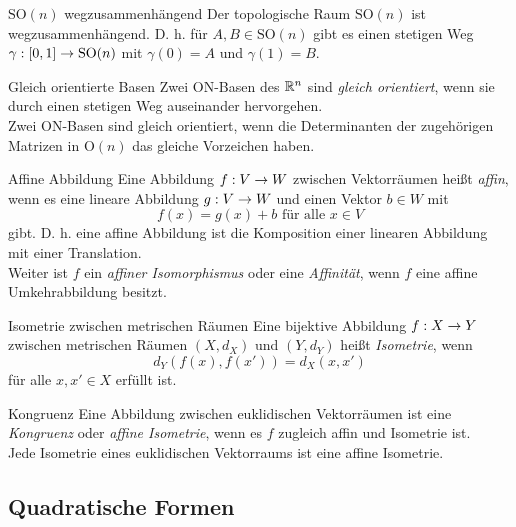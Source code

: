 \documentclass[main.tex]{subfiles}
\begin{document}
\begin{karte}{\( \mathrm{SO}(n) \) wegzusammenhängend}
    Der topologische Raum \( \mathrm{SO}(n) \) ist 
    wegzusammenhängend. D. h. für \( A,B\in \mathrm{SO}(n) \) 
    gibt es einen stetigen Weg \( \gamma : [0,1] \rightarrow \mathrm{SO}(n) \)
    mit \( \gamma(0) = A \) und \( \gamma(1) = B \).
\end{karte}

\begin{karte}{Gleich orientierte Basen}
    Zwei ON-Basen des \(\mathbb{R}^n\) sind \textit{gleich orientiert}, 
    wenn sie durch einen stetigen Weg auseinander hervorgehen.\\
    Zwei ON-Basen sind gleich orientiert, wenn die 
    Determinanten der zugehörigen Matrizen in \( \mathrm{O}(n) \) 
    das gleiche Vorzeichen haben.
\end{karte}

\begin{karte}{Affine Abbildung}
    Eine Abbildung \( f : V \rightarrow W \) zwischen Vektorräumen 
    heißt \textit{affin}, wenn es eine lineare Abbildung 
    \( g : V \rightarrow W \) und einen Vektor \( b \in W \) mit 
    \[ f(x) = g(x) + b \text{ für alle }x\in V \]
    gibt. D. h. eine affine Abbildung ist die Komposition 
    einer linearen Abbildung mit einer Translation.\\
    Weiter ist \(f\) ein \textit{affiner Isomorphismus} 
    oder eine \textit{Affinität}, wenn \(f\) eine affine 
    Umkehrabbildung besitzt.
\end{karte}

\begin{karte}{Isometrie zwischen metrischen Räumen}
    Eine bijektive Abbildung \( f : X \rightarrow Y \) 
    zwischen metrischen Räumen \( (X, d_X) \) und 
    \( (Y, d_Y) \) heißt \textit{Isometrie}, wenn 
    \[ d_Y(f(x), f(x')) = d_X(x,x') \] 
    für alle \( x,x' \in X \) erfüllt ist.
\end{karte}

\begin{karte}{Kongruenz}
    Eine Abbildung zwischen euklidischen 
    Vektorräumen ist eine \textit{Kongruenz}
    oder \textit{affine Isometrie}, wenn es \(f\) 
    zugleich affin und Isometrie ist.\\
    Jede Isometrie eines euklidischen Vektorraums ist 
    eine affine Isometrie.
\end{karte}

\subsection*{Quadratische Formen}
\end{document}
